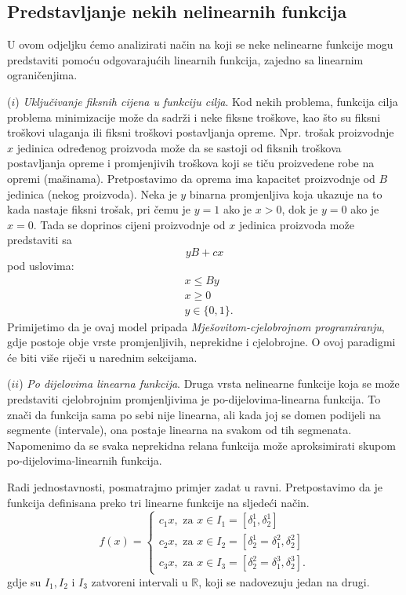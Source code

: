 \documentclass[a4paper, utf8, 11pt, colorlinks]{book}
\theoremstyle{definition}
\begin{document}

\subsection{Predstavljanje nekih nelinearnih funkcija} 

U ovom odjeljku ćemo analizirati način na koji se neke nelinearne funkcije mogu predstaviti pomoću odgovarajućih linearnih funkcija, zajedno sa linearnim ograničenjima. 

($i$) \emph{Uključivanje fiksnih cijena u funkciju cilja}. Kod nekih problema, funkcija cilja problema minimizacije može da sadrži i neke fiksne troškove, kao što su fiksni troškovi ulaganja ili fiksni troškovi postavljanja opreme. Npr. trošak proizvodnje $x$ jedinica određenog proizvoda može da se sastoji od fiksnih troškova postavljanja opreme i promjenjivih troškova koji se tiču proizvedene robe na opremi (mašinama). Pretpostavimo da oprema ima kapacitet proizvodnje od $B$ jedinica (nekog proizvoda). Neka je $y$ binarna promjenljiva koja ukazuje na to kada nastaje fiksni trošak, pri čemu  je $y=1$ ako je $x >0$, dok je $y=0$ ako je $x=0$. Tada se doprinos cijeni proizvodnje od $x$ jedinica proizvoda može predstaviti sa
$$ yB + c x $$ pod uslovima:
\begin{align}
     &x \leq By \\
     & x \geq 0 \\
     & y \in \{0, 1\}.
\end{align}
Primijetimo da je ovaj model pripada \emph{Mješovitom-cjelobrojnom programiranju}, gdje postoje obje vrste promjenljivih, neprekidne i cjelobrojne. O ovoj paradigmi će biti više riječi u narednim sekcijama. 

($ii$) \emph{{Po dijelovima linearna funkcija}}. Druga vrsta nelinearne funkcije koja se može predstaviti cjelobrojnim promjenljivima je po-dijelovima-linearna funkcija.  To znači da funkcija sama po sebi nije linearna, ali kada joj se domen podijeli na segmente (intervale), ona postaje linearna na svakom od tih segmenata. Napomenimo da se svaka neprekidna relana funkcija može aproksimirati skupom po-dijelovima-linearnih funkcija.  

Radi jednostavnosti, posmatrajmo primjer zadat u ravni. Pretpostavimo da je funkcija definisana preko tri linearne funkcije na sljedeći način.
$$f(x) = \begin{cases}
          c_1 x, \mbox{ za } x \in I_1 = [\delta^1_1, \delta^1_2] \\
          c_2 x, \mbox{ za } x \in I_2 = [\delta^1_2 = \delta^2_1, \delta^2_2] \\
          c_3 x, \mbox{ za } x \in I_3 = [\delta^2_2 = \delta^3_1, \delta^3_2].
      \end{cases}
$$
gdje su $I_1, I_2$ i $I_3$  zatvoreni intervali u $\mathbb{R}$, koji se nadovezuju jedan na drugi.
\end{document}

